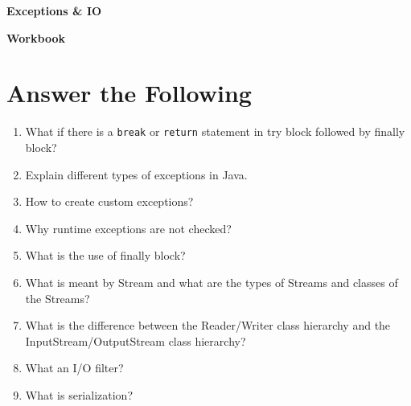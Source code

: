 \documentclass[11pt,a4paper]{article}
\def\AnswerBox{\fbox{\begin{minipage}{4in}\hfill\vspace{0.5in}\end{minipage}}}
\begin{document}
\centerline{\huge{ \textbf{Exceptions \& IO}}}

\vspace{1pc}

\centerline{\huge{ \textbf{ Workbook}}}

\section*{Answer the Following}
\begin{enumerate}\itemsep10pt

\item What if there is a \texttt{break} or \texttt{return} statement in try block followed by finally block?

\AnswerBox

\item Explain different types of exceptions in Java.

\AnswerBox

\item How to create custom exceptions?

\AnswerBox

\item Why runtime exceptions are not checked?

\AnswerBox

\item What is the use of finally block? 

\AnswerBox

\item  What is meant by Stream and what are the types of Streams and classes of the Streams?

\AnswerBox

\item What is the difference between the Reader/Writer class hierarchy and the InputStream/OutputStream class hierarchy?

\AnswerBox

\item What an I/O filter?

\AnswerBox

\item What is serialization?

\AnswerBox

\end{enumerate}
\end{document}
